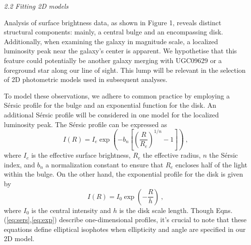 \vspace{0.1in}
{\noindent\large\textcolor{ullpurple}{\textit{2.2 Fitting 2D models}}}
\vspace{0.1in}


Analysis of surface brightness data, as shown in Figure 1, reveals distinct structural components: mainly, a central bulge and an encompassing disk. Additionally, when examining the galaxy in magnitude scale, a localized luminosity peak near the galaxy's center is apparent. We hypothetise that this feature could potentially be another galaxy merging with UGC09629 or a foreground star along our line of sight. This lump will be relevant in the selection of 2D photometric models used in subsequent analyses.

To model these observations, we adhere to common practice by employing a S\'{e}rsic profile for the bulge and an exponential function for the disk. An additional S\'{e}rsic profile will be considered in one model for the localized luminosity peak. The S\'{e}rsic profile can be expressed as 
\begin{equation}
    I(R)=I_{e}\exp\left(-b_{n}\left[\left(\frac{R}{R_{e}}\right)^{1/n}-1\right]\right) \ ,
    \label{eq:sers}
\end{equation}
where \( I_{e} \) is the effective surface brightness, \( R_{e} \) the effective radius, \( n \) the S\'{e}rsic index, and \( b_{n} \) a normalization constant to ensure that \( R_{e} \) encloses half of the light within the bulge. On the other hand, the exponential profile for the disk is given by 
\begin{equation}
    I(R)=I_{0}\exp\left(-\frac{R}{h}\right) \ ,
    \label{eq:exp}
\end{equation}
where \( I_{0} \) is the central intensity and \( h \) is the disk scale length. Though Eqns. (\ref{eq:sers},\ref{eq:exp}) describe one-dimensional profiles, it's crucial to note that these equations define elliptical isophotes when ellipticity and angle are specified in our 2D model.


